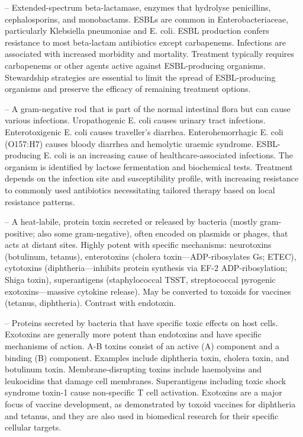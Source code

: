 -- Extended-spectrum beta-lactamase, enzymes that hydrolyse penicillins, cephalosporins, and monobactams. ESBLs are common in Enterobacteriaceae, particularly Klebsiella pneumoniae and E. coli. ESBL production confers resistance to most beta-lactam antibiotics except carbapenems. Infections are associated with increased morbidity and mortality. Treatment typically requires carbapenems or other agents active against ESBL-producing organisms. Stewardship strategies are essential to limit the spread of ESBL-producing organisms and preserve the efficacy of remaining treatment options.

-- A gram-negative rod that is part of the normal intestinal flora but can cause various infections. Uropathogenic E. coli causes urinary tract infections. Enterotoxigenic E. coli causes traveller's diarrhea. Enterohemorrhagic E. coli (O157:H7) causes bloody diarrhea and hemolytic uraemic syndrome. ESBL-producing E. coli is an increasing cause of healthcare-associated infections. The organism is identified by lactose fermentation and biochemical tests. Treatment depends on the infection site and susceptibility profile, with increasing resistance to commonly used antibiotics necessitating tailored therapy based on local resistance patterns.

-- A heat-labile, protein toxin secreted or released by bacteria (mostly gram-positive; also some gram-negative), often encoded on plasmids or phages, that acts at distant sites. Highly potent with specific mechanisms: neurotoxins (botulinum, tetanus), enterotoxins (cholera toxin—ADP-ribosylates Gs; ETEC), cytotoxins (diphtheria—inhibits protein synthesis via EF-2 ADP-ribosylation; Shiga toxin), superantigens (staphylococcal TSST, streptococcal pyrogenic exotoxins—massive cytokine release). May be converted to toxoids for vaccines (tetanus, diphtheria). Contrast with endotoxin.

-- Proteins secreted by bacteria that have specific toxic effects on host cells. Exotoxins are generally more potent than endotoxins and have specific mechanisms of action. A-B toxins consist of an active (A) component and a binding (B) component. Examples include diphtheria toxin, cholera toxin, and botulinum toxin. Membrane-disrupting toxins include haemolysins and leukocidins that damage cell membranes. Superantigens including toxic shock syndrome toxin-1 cause non-specific T cell activation. Exotoxins are a major focus of vaccine development, as demonstrated by toxoid vaccines for diphtheria and tetanus, and they are also used in biomedical research for their specific cellular targets.

